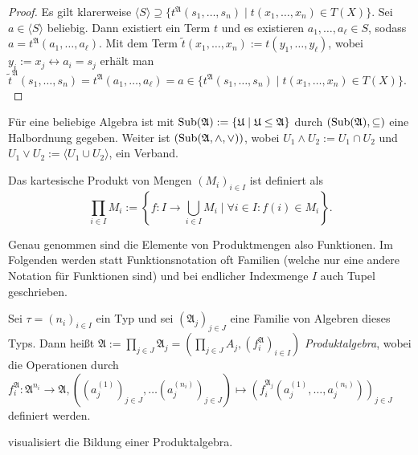 \begin{proof}
    Es gilt klarerweise $\langle S\rangle\supseteq \{t^\mathfrak{A}(s_1,\ldots,s_n)\mid t(x_1,\ldots,x_n)\in T(X)\}$.
    Sei $a\in\langle S\rangle$ beliebig. Dann existiert ein Term $t$ und es existieren $a_1,\ldots,a_\ell\in S$,
    sodass $a=t^\mathfrak{A}(a_1,\ldots,a_\ell)$. Mit dem Term $\tilde{t}(x_1,\ldots,x_n):=t(y_1,\ldots,y_\ell)$, wobei $y_i:=x_j\leftrightarrow a_i=s_j$
    erhält man $\tilde{t}^\mathfrak{A}(s_1,\ldots,s_n)=t^\mathfrak{A}(a_1,\ldots,a_\ell)=a\in\{t^\mathfrak{A}(s_1,\ldots,s_n)\mid t(x_1,\ldots,x_n)\in T(X)\}.$
\end{proof}

\begin{remark}
    Für eine beliebige Algebra ist mit $\operatorname{Sub}(\mathfrak{A}):=\{\mathfrak{U}\mid \mathfrak{U}\le \mathfrak{A}\}$ durch
    $(\operatorname{Sub}(\mathfrak{A}),\subseteq)$ eine Halbordnung gegeben. Weiter ist $(\operatorname{Sub}(\mathfrak{A},\land,\lor))$,
    wobei $U_1\land U_2:=U_1\cap U_2$ und $U_1\lor U_2:=\langle U_1\cup U_2\rangle$, ein Verband.
\end{remark}

\begin{remark}
    Das kartesische Produkt von Mengen $(M_i)_{i \in I}$ ist definiert als 
    $$ \prod_{i \in I} M_i := \left\{f: I \to \bigcup_{i \in I} M_i \mid \forall i \in I: f(i) \in M_i \right\}. $$

    Genau genommen sind die Elemente von Produktmengen also Funktionen. Im Folgenden werden statt Funktionsnotation oft Familien (welche nur eine andere Notation für Funktionen sind) und bei endlicher Indexmenge $I$ auch Tupel geschrieben.
    
\end{remark}

\begin{definition}
    Sei $\tau = (n_i)_{i\in I}$ ein Typ und sei $(\mathfrak{A}_j)_{j\in J}$ eine Familie von Algebren dieses Typs.
    Dann heißt $\mathfrak{A}:=\prod_{j\in J}\mathfrak{A}_j=(\prod_{j\in J}A_j,(f^\mathfrak{A}_i)_{i\in I})$ \emph{Produktalgebra},
    wobei die Operationen durch $f^\mathfrak{A}_i: \mathfrak{A}^{n_i} \to \mathfrak{A}, ((a_j^{(1)})_{j \in J}, \ldots (a_j^{(n_i)})_{j \in J}) \mapsto (f^{\mathfrak{A}_j}_i(a_j^{(1)}, \ldots, a_j^{(n_i)}))_{j \in J}$
    definiert werden.
\end{definition}

\begin{example}
     visualisiert die Bildung einer Produktalgebra.
\end{example}

